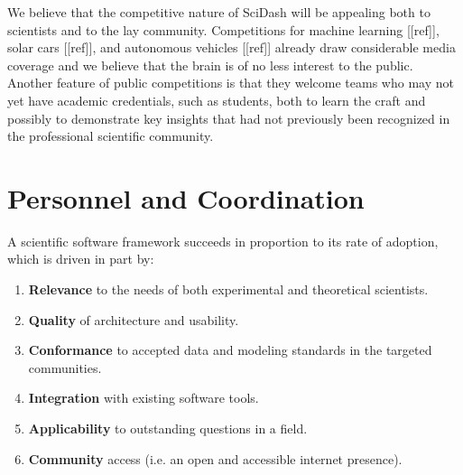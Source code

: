 \documentclass[11pt,letterpaper]{article}
\begin{document}
We believe that the competitive nature of SciDash will be appealing both to scientists and to the lay community.  Competitions for machine learning [[ref]], solar cars [[ref]], and autonomous vehicles [[ref]] already draw considerable media coverage and we believe that the brain is of no less interest to the public.  Another feature of public competitions is that they welcome teams who may not yet have academic credentials, such as students, both to learn the craft and possibly to demonstrate key insights that had not previously been recognized in the professional scientific community.  

\section{Personnel and Coordination}
\renewcommand{\theenumi}{\alph{enumi}}
A scientific software framework succeeds in proportion to its rate of adoption, which is driven in part by:
\begin{enumerate}
\item \textbf{Relevance} to the needs of both experimental and theoretical scientists.
\item \textbf{Quality} of architecture and usability.
\item \textbf{Conformance} to accepted data and modeling standards in the targeted communities.
\item \textbf{Integration} with existing software tools.  
\item \textbf{Applicability} to outstanding questions in a field.
\item \textbf{Community} access (i.e. an open and accessible internet presence).  
\end{enumerate}
\end{document}
